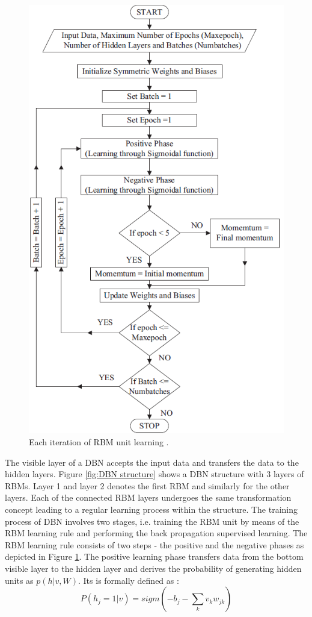 \begin{figure}[ht]
	\centering
	\includegraphics[scale=0.6]{gfx/dbn3.png}
    \captionsetup{justification=centering}
	\caption{Each iteration of RBM unit learning \cite{DBLP:journals/ress/TamilselvanW13}.}
	\label{fig:DBN_layer_structure}
\end{figure}
The visible layer of a DBN accepts the input data and transfers the data to the hidden layers. Figure \ref{fig:DBN structure} shows a DBN structure with 3 layers of RBMs. Layer 1 and layer 2 denotes the first RBM and similarly for the other layers. Each of the connected RBM layers undergoes the same transformation concept leading to a regular learning process within the structure. The training process of DBN involves two stages, i.e. training the RBM unit by means of the RBM learning rule and performing the back propagation supervised learning. The RBM learning rule consists of two steps - the positive and the negative phases as depicted in Figure \ref{fig:DBN_layer_structure}.
The positive learning phase transfers data from the bottom visible layer to the hidden layer and derives the probability of generating hidden units as $p(h|v,W)$. Its is formally defined as :
\begin{equation}
P(h_j = 1|v) = sigm ( -b_j - \sum_k v_k w_{jk} )    
\end{equation}

